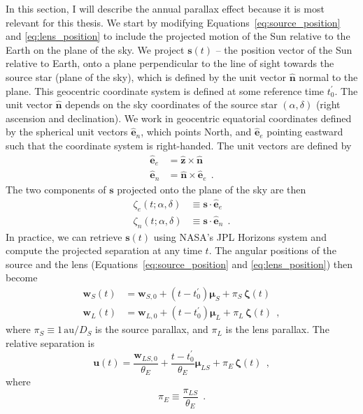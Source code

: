 \documentclass[12pt,dvipsnames]{report}
\renewcommand{\vec}[1]{\boldsymbol{\mathbf{#1}}}
\newcommand{\hquad}{~~}
\begin{document}
In this section, I will describe the annual parallax effect because it is most relevant
for this thesis. We start by
modifying Equations~\ref{eq:source_position} and \ref{eq:lens_position} to
include the projected motion of the Sun relative to the Earth on the plane of
the sky. We project $\mathbf s(t)$ -- the position vector of the Sun relative to
Earth, onto a plane perpendicular to the line of sight towards the source star
(plane of the sky), which is defined by the unit vector $\boldsymbol{\hat n}$
normal to the plane. This geocentric coordinate system is defined at some reference time
$t_0^\prime$.  The unit vector $\boldsymbol{\hat n}$ depends on the sky
coordinates of the source star $(\alpha,\delta)$ (right ascension and
declination). We work in geocentric equatorial coordinates defined by
the spherical unit vectors $\hat{\mathbf e}_n$, which points North, and
$\hat{\mathbf e}_e$ pointing eastward such that the coordinate system is
right-handed. The unit vectors are defined by
\begin{align}
    \hat{\mathbf e}_e & = \hat{\mathbf z}\times \hat{\mathbf n}  \\
    \hat{\mathbf e}_n & = \hat{\mathbf n}\times\hat{\mathbf e}_e
    \hquad.
\end{align}
The two components of $\mathbf s$ projected onto the plane of the sky are then
\begin{align}
    \zeta_e(t;\alpha,\delta)&\equiv \mathbf s\cdot \hat{\mathbf e}_e
    \label{eq:zeta_e_t}\\
    \zeta_n(t;\alpha,\delta)&\equiv \mathbf s\cdot \hat{\mathbf e}_n
    \hquad.
    \label{eq:zeta_n_t}
\end{align}
In practice, we can retrieve $\mathbf{s}(t)$ using NASA's JPL Horizons system and compute
the projected separation at any time $t$. 
The angular positions of the source and the lens
(Equations~\ref{eq:source_position} and \ref{eq:lens_position}) then become
\begin{align}
    \vec{w}_S(t) & = \vec{w}_{S,0}+(t-t_0^\prime)\boldsymbol{\mu}_S
    +\pi_S\,\boldsymbol{\zeta}(t)                            \\
    \vec{w}_L(t) & = \vec{w}_{L,0}+(t-t_0^\prime)\boldsymbol{\mu}_L
    +\pi_L\,\boldsymbol{\zeta}(t)
    \hquad,
\end{align}
where  $\pi_S\equiv 1\,\mathrm{au}/D_S$ is the source parallax, and $\pi_L$ is the
lens parallax.
The relative separation is 
\begin{equation}
    \boldsymbol{u}(t)= \frac{\vec{w}_{LS, 0}}{\theta_E}
    +\frac{t-t_0^\prime}{\theta_E}\boldsymbol{\mu}_{LS}+\pi_{E}\,\boldsymbol{\zeta}(t)
    \hquad,
    \label{eq:relative_separation_parallax}
\end{equation}
where
\begin{equation}
    \pi_E\equiv \frac{\pi_{LS}}{\theta_E}
    \hquad.
    \label{eq:pi_E}
\end{equation}
\end{document}

